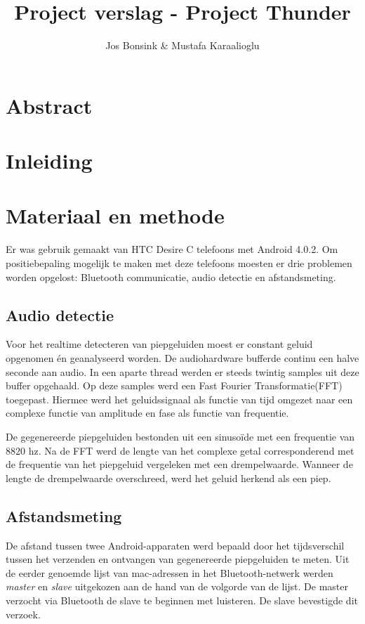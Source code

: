 \documentclass[12pt]{article}
\author{Jos Bonsink \& Mustafa Karaalioglu}
\begin{document}
\title{Project verslag - Project Thunder}
\maketitle

\section{Abstract}

\section{Inleiding}

\section{Materiaal en methode}
Er was gebruik gemaakt van HTC Desire C telefoons met Android 4.0.2. Om positiebepaling mogelijk te maken met deze telefoons moesten er drie problemen worden opgelost: Bluetooth communicatie, audio detectie en afstandsmeting.

\subsection{Audio detectie}
Voor het realtime detecteren van piepgeluiden moest er constant geluid opgenomen \'en geanalyseerd worden.
De audiohardware bufferde continu een halve seconde aan audio. In een aparte thread werden er steeds twintig samples uit deze buffer opgehaald. Op deze samples werd een Fast Fourier Transformatie(FFT) toegepast. Hiermee werd het geluidssignaal als functie van tijd omgezet naar een complexe functie van amplitude en fase als functie van frequentie. 

De gegenereerde piepgeluiden bestonden uit een sinuso\"ide met een frequentie van $8820$ hz. Na de FFT werd de lengte van het complexe getal corresponderend met de frequentie van het piepgeluid vergeleken met een drempelwaarde. Wanneer de lengte de drempelwaarde overschreed, werd het geluid herkend als een piep.

\subsection{Afstandsmeting}
De afstand tussen twee Android-apparaten werd bepaald door het tijdsverschil tussen het verzenden en ontvangen van gegenereerde piepgeluiden te meten. Uit de eerder genoemde lijst van mac-adressen in het Bluetooth-netwerk werden \textit{master} en \textit{slave} uitgekozen aan de hand van de volgorde van de lijst. De master verzocht via Bluetooth de slave te beginnen met luisteren. De slave bevestigde dit verzoek.
\end{document}
